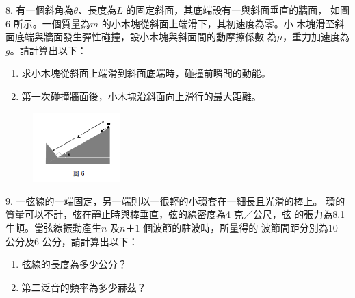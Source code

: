 \documentclass[cn,10pt,math=newtx,chinesefont=founder,device=ig]{elegantbook}
\begin{document}
\begin{example}
   8. 有一個斜角為$\theta$、長度為$L$ 的固定斜面，其底端設有一與斜面垂直的牆面，
如圖6 所示。一個質量為$m$ 的小木塊從斜面上端滑下，其初速度為零。小
木塊滑至斜面底端與牆面發生彈性碰撞，設小木塊與斜面間的動摩擦係數
為$\mu$，重力加速度為$g$。請計算出以下：
\begin{enumerate}[label=(\arabic*)] 
  \item 求小木塊從斜面上端滑到斜面底端時，碰撞前瞬間的動能。
  \item 第一次碰撞牆面後，小木塊沿斜面向上滑行的最大距離。
    \end{enumerate}
    
    \rightline{[高雄聯招教甄109]}
\end{example}
\begin{solution}
    
\end{solution}
\begin{figure}[htbp]
    \flushright
    \includegraphics[width=0.3\textwidth]{image/109高雄8.png}
  \end{figure}
\newpage



\begin{example}
   9. 一弦線的一端固定，另一端則以一很輕的小環套在一細長且光滑的棒上。
環的質量可以不計，弦在靜止時與棒垂直，弦的線密度為4 $克／公尺$，弦
的張力為8.1 牛頓。當弦線振動產生$n$ 及$n＋1$ 個波節的駐波時，所量得的
波節間距分別為10 公分及6 公分，請計算出以下：
\begin{enumerate}[label=(\arabic*)] 
  \item 弦線的長度為多少公分？
  \item 第二泛音的頻率為多少赫茲？
    \end{enumerate}
    
    \rightline{[高雄聯招教甄109]}
\end{example}
\begin{solution}
    
\end{solution}

\newpage
\end{document}
